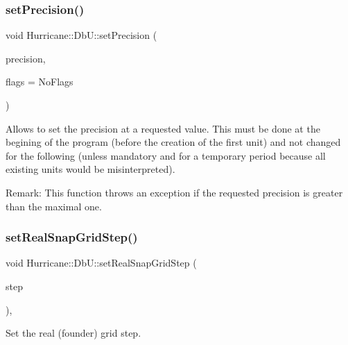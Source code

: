 \subsubsection{\texorpdfstring{set\+Precision()}{setPrecision()}}
{\footnotesize\ttfamily void Hurricane\+::\+Db\+U\+::set\+Precision (\begin{DoxyParamCaption}\item[{unsigned int}]{precision,  }\item[{unsigned int}]{flags = {\ttfamily NoFlags} }\end{DoxyParamCaption})\hspace{0.3cm}{\ttfamily [static]}}

Allows to set the precision at a requested value. This must be done at the begining of the program (before the creation of the first unit) and not changed for the following (unless mandatory and for a temporary period because all existing units would be misinterpreted).

\begin{DoxyParagraph}{Remark\+: This function throws an exception if the requested precision }
is greater than the maximal one. 
\end{DoxyParagraph}
\mbox{\label{group__DbUGroup_ga202cc3aa3364c2224647a29dde047fae}} 
\subsubsection{\texorpdfstring{set\+Real\+Snap\+Grid\+Step()}{setRealSnapGridStep()}}
{\footnotesize\ttfamily void Hurricane\+::\+Db\+U\+::set\+Real\+Snap\+Grid\+Step (\begin{DoxyParamCaption}\item[{\mbox{\hyperlink{group__DbUGroup_ga4fbfa3e8c89347af76c9628ea06c4146}{Db\+U\+::\+Unit}}}]{step }\end{DoxyParamCaption})\hspace{0.3cm}{\ttfamily [inline]}, {\ttfamily [static]}}

Set the real (founder) grid step. \mbox{\label{group__DbUGroup_ga09e46fcca6aaca94851adfa196e10170}} 

